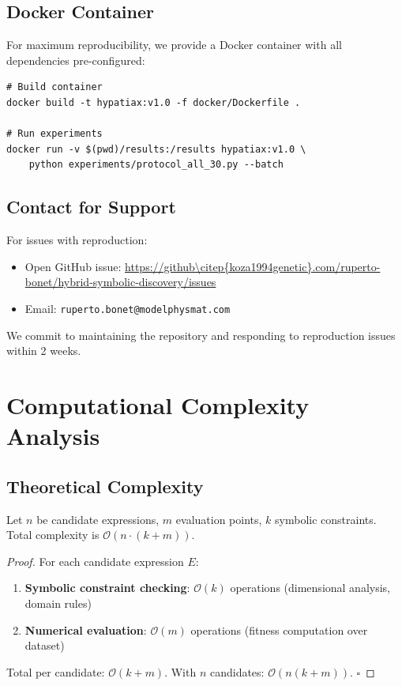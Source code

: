 \documentclass[twoside,11pt]{article}
\newcommand{\qed}{\hfill$\square$}
\begin{document}
\subsection{Docker Container}

For maximum reproducibility, we provide a Docker container with all dependencies pre-configured:

\begin{small}
\begin{verbatim}
# Build container
docker build -t hypatiax:v1.0 -f docker/Dockerfile .

# Run experiments
docker run -v $(pwd)/results:/results hypatiax:v1.0 \
    python experiments/protocol_all_30.py --batch
\end{verbatim}
\end{small}

\subsection{Contact for Support}

For issues with reproduction:
\begin{itemize}
\item Open GitHub issue: \url{https://github\citep{koza1994genetic}.com/ruperto-bonet/hybrid-symbolic-discovery/issues}
\item Email: \texttt{ruperto.bonet@modelphysmat.com}
\end{itemize}

We commit to maintaining the repository and responding to reproduction issues within 2 weeks.


\section{Computational Complexity Analysis}
\label{app:complexity}

\subsection{Theoretical Complexity}

\begin{proposition}
Let $n$ be candidate expressions, $m$ evaluation points, $k$ symbolic constraints. Total complexity is $\mathcal{O}(n \cdot (k + m))$.
\end{proposition}

\begin{proof}
For each candidate expression $E$:
\begin{enumerate}
\item \textbf{Symbolic constraint checking}: $\mathcal{O}(k)$ operations (dimensional analysis, domain rules)
\item \textbf{Numerical evaluation}: $\mathcal{O}(m)$ operations (fitness computation over dataset)
\end{enumerate}

Total per candidate: $\mathcal{O}(k + m)$. With $n$ candidates: $\mathcal{O}(n(k + m))$. \qed
\end{proof}
\end{document}

